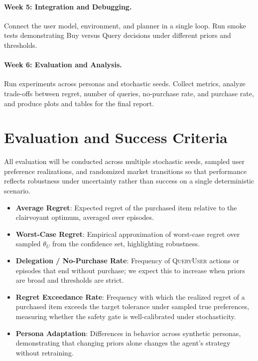 \documentclass[11pt]{article}
\begin{document}
\paragraph{Week 5: Integration and Debugging.} Connect the user model, environment, and planner in a single loop. Run smoke tests demonstrating Buy versus Query decisions under different priors and thresholds.

\paragraph{Week 6: Evaluation and Analysis.} Run experiments across personas and stochastic seeds. Collect metrics, analyze trade-offs between regret, number of queries, no-purchase rate, and purchase rate, and produce plots and tables for the final report.

\section{Evaluation and Success Criteria}

All evaluation will be conducted across multiple stochastic seeds, sampled user preference realizations, and randomized market transitions so that performance reflects robustness under uncertainty rather than success on a single deterministic scenario.

\begin{itemize}
    \item \textbf{Average Regret}: Expected regret of the purchased item relative to the clairvoyant optimum, averaged over episodes.
    \item \textbf{Worst-Case Regret}: Empirical approximation of worst-case regret over sampled $\theta_U$ from the confidence set, highlighting robustness.
    \item \textbf{Delegation / No-Purchase Rate}: Frequency of \textsc{QueryUser} actions or episodes that end without purchase; we expect this to increase when priors are broad and thresholds are strict.
    \item \textbf{Regret Exceedance Rate}: Frequency with which the realized regret of a purchased item exceeds the target tolerance under sampled true preferences, measuring whether the safety gate is well-calibrated under stochasticity.
    \item \textbf{Persona Adaptation}: Differences in behavior across synthetic personas, demonstrating that changing priors alone changes the agent's strategy without retraining.
\end{itemize}
\end{document}
